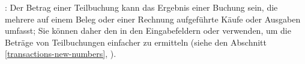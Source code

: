 \Note{}: Der Betrag einer Teilbuchung kann das Ergebnis einer Buchung sein, die mehrere auf einem Beleg oder einer Rechnung aufgeführte Käufe oder Ausgaben umfasst; Sie können daher den  in den Eingabefeldern  oder  verwenden, um die Beträge von Teilbuchungen einfacher zu ermitteln (siehe den Abschnitt \vref{transactions-new-numbers}, ).

